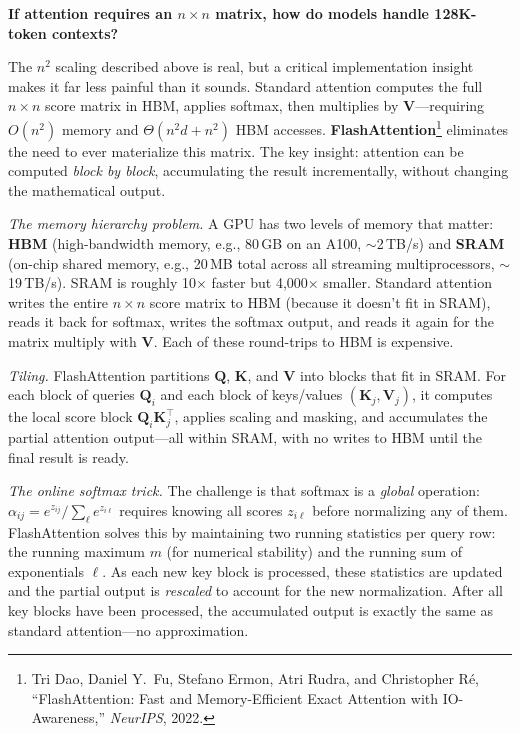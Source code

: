 \begin{notebox}
\textbf{If attention requires an $n \times n$ matrix, how do models handle 128K-token contexts?}

The $n^2$ scaling described above is real, but a critical implementation insight makes it far less painful than it sounds. Standard attention computes the full $n \times n$ score matrix in HBM, applies softmax, then multiplies by $\mathbf{V}$---requiring $O(n^2)$ memory and $\Theta(n^2 d + n^2)$ HBM accesses. \textbf{FlashAttention}\footnote{Tri Dao, Daniel Y.\ Fu, Stefano Ermon, Atri Rudra, and Christopher R\'{e}, ``FlashAttention: Fast and Memory-Efficient Exact Attention with IO-Awareness,'' \emph{NeurIPS}, 2022.} eliminates the need to ever materialize this matrix. The key insight: attention can be computed \emph{block by block}, accumulating the result incrementally, without changing the mathematical output.

\emph{The memory hierarchy problem.} A GPU has two levels of memory that matter: \textbf{HBM} (high-bandwidth memory, e.g., 80\,GB on an A100, $\sim$2\,TB/s) and \textbf{SRAM} (on-chip shared memory, e.g., 20\,MB total across all streaming multiprocessors, $\sim$19\,TB/s). SRAM is roughly 10$\times$ faster but 4,000$\times$ smaller. Standard attention writes the entire $n \times n$ score matrix to HBM (because it doesn't fit in SRAM), reads it back for softmax, writes the softmax output, and reads it again for the matrix multiply with $\mathbf{V}$. Each of these round-trips to HBM is expensive.

\emph{Tiling.} FlashAttention partitions $\mathbf{Q}$, $\mathbf{K}$, and $\mathbf{V}$ into blocks that fit in SRAM. For each block of queries $\mathbf{Q}_i$ and each block of keys/values $(\mathbf{K}_j, \mathbf{V}_j)$, it computes the local score block $\mathbf{Q}_i \mathbf{K}_j^\top$, applies scaling and masking, and accumulates the partial attention output---all within SRAM, with no writes to HBM until the final result is ready.

\emph{The online softmax trick.} The challenge is that softmax is a \emph{global} operation: $\alpha_{ij} = e^{z_{ij}} / \sum_\ell e^{z_{i\ell}}$ requires knowing all scores $z_{i\ell}$ before normalizing any of them. FlashAttention solves this by maintaining two running statistics per query row: the running maximum $m$ (for numerical stability) and the running sum of exponentials $\ell$. As each new key block is processed, these statistics are updated and the partial output is \emph{rescaled} to account for the new normalization. After all key blocks have been processed, the accumulated output is exactly the same as standard attention---no approximation.


\end{notebox}

